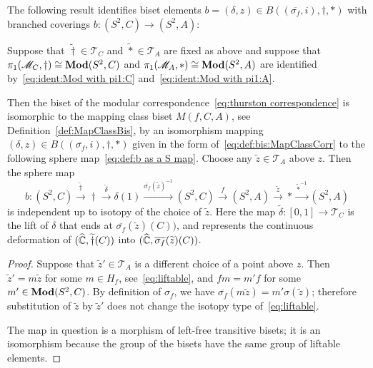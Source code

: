 \documentclass{amsart}
\begin{document}
The following result identifies biset elements
$b=(\delta, z)\in B((\overline{\sigma_f},i), \dagger,*)$ with branched
coverings $b\colon (S^2,C)\to (S^2,A)$:
\begin{prop}\label{prop:modular correspondence}
  Suppose that $\widetilde \dagger\in \mathscr T_ C$ and
  $\widetilde *\in \mathscr T_ A$ are fixed as above and suppose that
  $\pi_1(\mathscr M_C,\dagger)\cong \mathbf{\relax Mod}(S^2,C)$ and
  $\pi_1(\mathscr M_A,*)\cong \mathbf{\relax Mod}(S^2,A)$ are identified
  by~\eqref{eq:ident:Mod with pi1:C} and~\eqref{eq:ident:Mod with
    pi1:A}.

  Then the biset of the modular correspondence~\eqref{eq:thurston
    correspondence} is isomorphic to the mapping class biset
  $M(f,C,A)$, see Definition~\ref{def:MapClassBis}, by an isomorphism
  mapping $(\delta,z)\in B((\overline{\sigma_f},i), \dagger,*)$ given
  in the form of~\eqref{eq:def:bis:MapClassCorr} to the following
  sphere map~\eqref{eq:def:b as a S map}. Choose any
  $\widetilde z\in \mathscr T_A$ above $z$. Then the sphere map
  \begin{equation}\label{eq:def:b as a S map}
    b\colon (S^2,C)\overset{\widetilde\dagger }\longrightarrow \dagger \overset{\widetilde\delta}{\longrightarrow}\delta(1)
    \overset{\overline{\sigma_f} (\widetilde z)^{-1}}{\longrightarrow}(S^2,C)
    \overset{f}{\longrightarrow}(S^2,A)
    \overset{\widetilde z}{\longrightarrow}
    * \overset{\widetilde *^{-1}}\longrightarrow (S^2,A)
  \end{equation}
  is independent up to isotopy of the choice of $\widetilde z$. Here
  the map $\widetilde\delta\colon[0,1]\to\mathscr T_C$ is the lift of
  $\delta$ that ends at $\overline{\sigma_f} (\widetilde z)(C))$, and
  represents the continuous deformation of
  $({\widehat{{\mathbb C}}},\widetilde\dagger(C))$ into
  $({\widehat{{\mathbb C}}},\overline{\sigma_f} (\widetilde z)(C))$.
\end{prop}
\begin{proof}
  Suppose that $\widetilde z' \in \mathscr T_A$ is a different choice
  of a point above $z$. Then $\widetilde z'= m\widetilde z$ for some
  $m\in H_f$, see~\eqref{eq:liftable}, and $f m=m' f$ for some
  $m'\in \mathbf{\relax Mod}(S^2,C)$. By definition of $\sigma_f$, we have
  $\overline{\sigma_f}(m \widetilde z)=m' \sigma(\widetilde z)$;
  therefore substitution of $\widetilde z$ by $\widetilde z'$ does not
  change the isotopy type of~\eqref{eq:liftable}.

  The map in question is a morphism of left-free transitive bisets; it
  is an isomorphism because the group of the bisets have the same
  group of liftable elements.
\end{proof}
\end{document}
